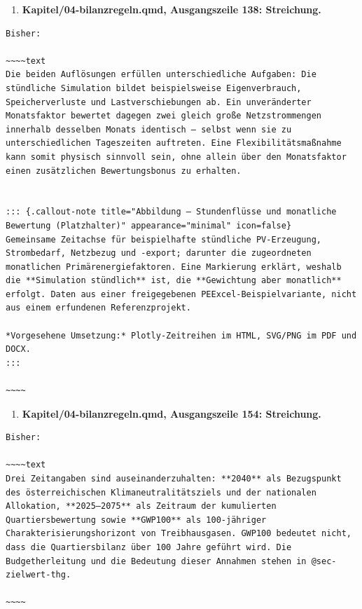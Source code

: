 \documentclass[
  ngerman,
  a4paper,
  DIV=11]{scrreprt}
\providecommand{\tightlist}{%
  \setlength{\itemsep}{0pt}\setlength{\parskip}{0pt}}
\begin{document}
\begin{enumerate}
\def\labelenumi{\arabic{enumi}.}
\setcounter{enumi}{115}
\tightlist
\item
  \textbf{Kapitel/04-bilanzregeln.qmd, Ausgangszeile 138: Streichung.}
\end{enumerate}

\begin{verbatim}
Bisher:

~~~~text
Die beiden Auflösungen erfüllen unterschiedliche Aufgaben: Die stündliche Simulation bildet beispielsweise Eigenverbrauch, Speicherverluste und Lastverschiebungen ab. Ein unveränderter Monatsfaktor bewertet dagegen zwei gleich große Netzstrommengen innerhalb desselben Monats identisch – selbst wenn sie zu unterschiedlichen Tageszeiten auftreten. Eine Flexibilitätsmaßnahme kann somit physisch sinnvoll sein, ohne allein über den Monatsfaktor einen zusätzlichen Bewertungsbonus zu erhalten.


::: {.callout-note title="Abbildung – Stundenflüsse und monatliche Bewertung (Platzhalter)" appearance="minimal" icon=false}
Gemeinsame Zeitachse für beispielhafte stündliche PV-Erzeugung, Strombedarf, Netzbezug und -export; darunter die zugeordneten monatlichen Primärenergiefaktoren. Eine Markierung erklärt, weshalb die **Simulation stündlich** ist, die **Gewichtung aber monatlich** erfolgt. Daten aus einer freigegebenen PEExcel-Beispielvariante, nicht aus einem erfundenen Referenzprojekt.

*Vorgesehene Umsetzung:* Plotly-Zeitreihen im HTML, SVG/PNG im PDF und DOCX.
:::

~~~~
\end{verbatim}

\begin{enumerate}
\def\labelenumi{\arabic{enumi}.}
\setcounter{enumi}{116}
\tightlist
\item
  \textbf{Kapitel/04-bilanzregeln.qmd, Ausgangszeile 154: Streichung.}
\end{enumerate}

\begin{verbatim}
Bisher:

~~~~text
Drei Zeitangaben sind auseinanderzuhalten: **2040** als Bezugspunkt des österreichischen Klimaneutralitätsziels und der nationalen Allokation, **2025–2075** als Zeitraum der kumulierten Quartiersbewertung sowie **GWP100** als 100-jähriger Charakterisierungshorizont von Treibhausgasen. GWP100 bedeutet nicht, dass die Quartiersbilanz über 100 Jahre geführt wird. Die Budgetherleitung und die Bedeutung dieser Annahmen stehen in @sec-zielwert-thg.

~~~~
\end{verbatim}
\end{document}
